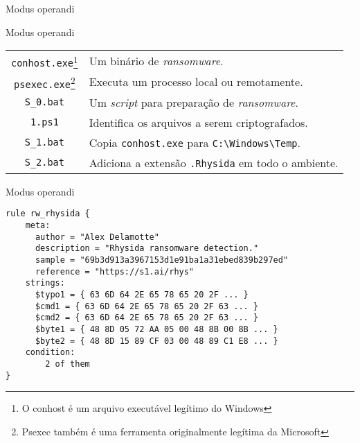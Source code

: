 \documentclass[bookmarks=false,aspectratio=169,9pt]{beamer}
\begin{document}
\begin{frame}{Modus operandi}
\begin{figure}[!ht]
\centering
{}
\end{figure}
\end{frame}
\begin{frame}[fragile]{Modus operandi}
\begin{center}
\begin{tabular}{c|p{9cm}}
			\verb|conhost.exe|\footnote{O conhost é um arquivo executável legítimo do Windows} & Um binário de \textit{ransomware}. \\
			\verb|psexec.exe|\footnote{Psexec também é uma ferramenta originalmente legítima da Microsoft} & Executa um processo local ou remotamente. \\
			\verb|S_0.bat|     & Um \textit{script} para preparação de \textit{ransomware}.\\
			\verb|1.ps1|       & Identifica os arquivos a serem criptografados.\\
			\verb|S_1.bat|     & Copia \verb|conhost.exe| para \verb|C:\Windows\Temp|.\\
			\verb|S_2.bat|     & Adiciona a extensão \verb|.Rhysida| em todo o ambiente.
		\end{tabular}
\end{center}
\end{frame}
\begin{frame}[fragile]{Modus operandi}
\begin{center}
\begin{lstlisting}[caption=Regras YARA fornecidas pela equipe do SentinelOne]
rule rw_rhysida {
    meta:
      author = "Alex Delamotte"
      description = "Rhysida ransomware detection."
      sample = "69b3d913a3967153d1e91ba1a31ebed839b297ed"
      reference = "https://s1.ai/rhys"
    strings:
      $typo1 = { 63 6D 64 2E 65 78 65 20 2F ... }
      $cmd1 = { 63 6D 64 2E 65 78 65 20 2F 63 ... }
      $cmd2 = { 63 6D 64 2E 65 78 65 20 2F 63 ... }
      $byte1 = { 48 8D 05 72 AA 05 00 48 8B 00 8B ... }
      $byte2 = { 48 8D 15 89 CF 03 00 48 89 C1 E8 ... }
    condition:
        2 of them
}
\end{lstlisting}
\end{center}
\end{frame}
\end{document}
